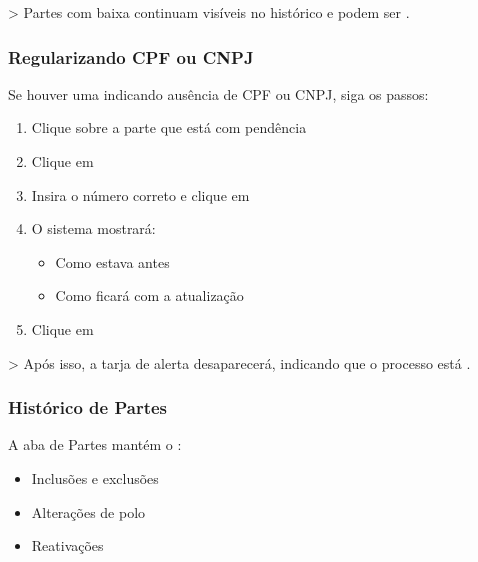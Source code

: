 \documentclass[letterpaper,10pt,brazil]{sphinxmanual}
\begin{document}
\sphinxAtStartPar
\textgreater{} Partes com baixa continuam visíveis no histórico e podem ser .


\subsubsection{Regularizando CPF ou CNPJ}
\label{\detokenize{projud_23_cadastroparte:regularizando-cpf-ou-cnpj}}
\sphinxAtStartPar
Se houver uma  indicando ausência de CPF ou CNPJ, siga os passos:
\begin{enumerate}
%
\item {} 
\sphinxAtStartPar
Clique sobre a parte que está com pendência

\item {} 
\sphinxAtStartPar
Clique em 

\item {} 
\sphinxAtStartPar
Insira o número correto e clique em 

\item {} 
\sphinxAtStartPar
O sistema mostrará:
\begin{itemize}
\item {} 
\sphinxAtStartPar
Como estava antes

\item {} 
\sphinxAtStartPar
Como ficará com a atualização

\end{itemize}

\item {} 
\sphinxAtStartPar
Clique em 

\end{enumerate}

\sphinxAtStartPar
\textgreater{} Após isso, a tarja de alerta desaparecerá, indicando que o processo está .


\subsubsection{Histórico de Partes}
\label{\detokenize{projud_23_cadastroparte:historico-de-partes}}
\sphinxAtStartPar
A aba de Partes mantém o :
\begin{itemize}
\item {} 
\sphinxAtStartPar
Inclusões e exclusões

\item {} 
\sphinxAtStartPar
Alterações de polo

\item {} 
\sphinxAtStartPar
Reativações

\end{itemize}
\end{document}
